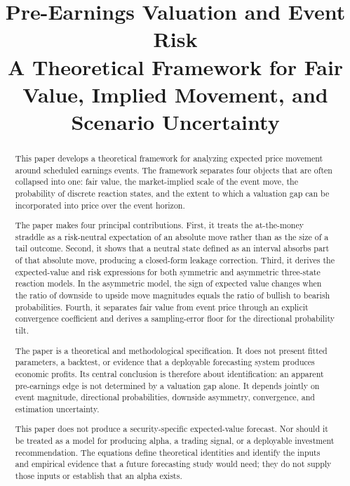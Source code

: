 

\title{Pre-Earnings Valuation and Event Risk\\
  \large A Theoretical Framework for Fair Value, Implied Movement, and Scenario Uncertainty}



\maketitle

\begin{abstract}
\noindent
This paper develops a theoretical framework for analyzing expected price
movement around scheduled earnings events. The framework separates four objects
that are often collapsed into one: fair value, the market-implied scale of the
event move, the probability of discrete reaction states, and the extent to
which a valuation gap can be incorporated into price over the event horizon.

The paper makes four principal contributions. First, it treats the at-the-money
straddle as a risk-neutral expectation of an absolute move rather than as the
size of a tail outcome. Second, it shows that a neutral state defined as an
interval absorbs part of that absolute move, producing a closed-form leakage
correction. Third, it derives the expected-value and risk expressions for both
symmetric and asymmetric three-state reaction models. In the asymmetric model,
the sign of expected value changes when the ratio of downside to upside move
magnitudes equals the ratio of bullish to bearish probabilities. Fourth, it
separates fair value from event price through an explicit convergence
coefficient and derives a sampling-error floor for the directional probability
tilt.

The paper is a theoretical and methodological specification. It does not
present fitted parameters, a backtest, or evidence that a deployable forecasting
system produces economic profits. Its central conclusion is therefore about
identification: an apparent pre-earnings edge is not determined by a valuation
gap alone. It depends jointly on event magnitude, directional probabilities,
downside asymmetry, convergence, and estimation uncertainty.

This paper does not produce a security-specific expected-value forecast. Nor
should it be treated as a model for producing alpha, a trading signal, or a
deployable investment recommendation. The equations define theoretical
identities and identify the inputs and empirical evidence that a future
forecasting study would need; they do not supply those inputs or establish that
an alpha exists.
\end{abstract}

